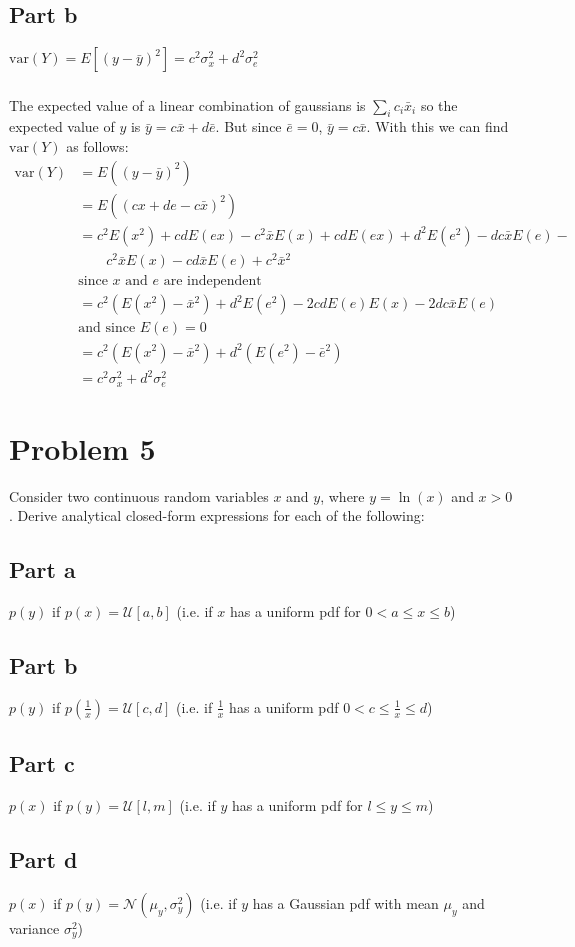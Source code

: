 \documentclass[11pt]{article}
\begin{document}
\subsection*{Part b}
$\text{var}(Y) = E[(y-\bar{y})^2]=c^2\sigma_x^2+d^2\sigma_e^2$

\subparagraph*{}
The expected value of a linear combination of gaussians is $\sum_i c_i\bar{x}_i$ so the expected value of $y$ is $\bar{y}=c\bar{x}+d\bar{e}$. But since $\bar{e}=0$, $\bar{y}=c\bar{x}$. With this we can find $\text{var}(Y)$ as follows:
\begin{align*}
	\text{var}(Y) &= E((y-\bar{y})^2) \\
	&= E((cx+de-c\bar{x})^2) \\
	&= c^2E(x^2)+cdE(ex)-c^2\bar{x}E(x)+cdE(ex)+d^2E(e^2)-dc\bar{x}E(e)-\\
	&\qquad c^2\bar{x}E(x)-cd\bar{x}E(e)+c^2\bar{x}^2 \\
	& \text{since $x$ and $e$ are independent} \\
	&= c^2(E(x^2)-\bar{x}^2)+d^2E(e^2)-2cdE(e)E(x)-2dc\bar{x}E(e)\\
	& \text{and since $E(e)=0$} \\
	&= c^2(E(x^2)-\bar x^2) + d^2(E(e^2) - \bar{e}^2) \\
	&= c^2\sigma_x^2 + d^2\sigma_e^2
\end{align*}

\section*{Problem 5}
Consider two continuous random variables $x$ and $y$, where $y=\ln(x)$ and $x>0$. Derive analytical closed-form expressions for each of the following:

\subsection*{Part a}
$p(y)$ if $p(x) = \mathcal{U}[a,b]$ (i.e. if $x$ has a uniform pdf for $0<a\leq x \leq b$)

\subsection*{Part b}
$p(y)$ if $p(\frac{1}{x})=\mathcal{U}[c,d]$ (i.e. if $\frac{1}{x}$ has a uniform pdf $0<c\leq \frac{1}{x} \leq d$)

\subsection*{Part c}
$p(x)$ if $p(y) = \mathcal{U}[l,m]$ (i.e. if $y$ has a uniform pdf for $l\leq y \leq m$)

\subsection*{Part d}
$p(x)$ if $p(y) = \mathcal{N}(\mu_y,\sigma_y^2)$ (i.e. if $y$ has a Gaussian pdf with mean $\mu_y$ and variance $\sigma_y^2$)
\end{document}
